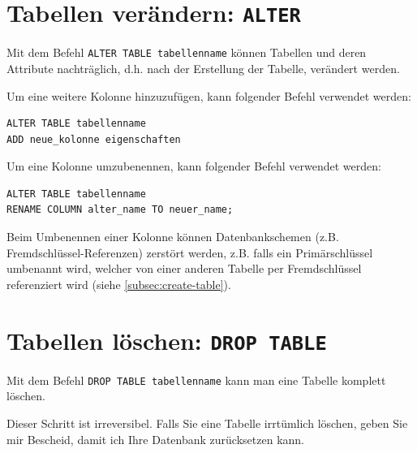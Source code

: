 \section{Tabellen verändern: \texorpdfstring{\lstinline|ALTER|}{ALTER}}
Mit dem Befehl \lstinline|ALTER TABLE tabellenname| können Tabellen und deren Attribute nachträglich, d.h. nach der Erstellung der Tabelle, verändert werden.

\begin{myexample}
Um eine weitere Kolonne hinzuzufügen, kann folgender Befehl verwendet werden:
\begin{lstlisting}
ALTER TABLE tabellenname
ADD neue_kolonne eigenschaften
\end{lstlisting}
\end{myexample}

\begin{myexample}
Um eine Kolonne umzubenennen, kann folgender Befehl verwendet werden:
\begin{lstlisting}
ALTER TABLE tabellenname
RENAME COLUMN alter_name TO neuer_name;
\end{lstlisting}
\end{myexample}
\begin{mycaution}
Beim Umbenennen einer Kolonne können Datenbankschemen (z.B. Fremdschlüssel-Referenzen) zerstört werden, z.B. falls ein Primärschlüssel umbenannt wird, welcher von einer anderen Tabelle per Fremdschlüssel referenziert wird (siehe \cref{subsec:create-table}).
\end{mycaution}

\section{Tabellen löschen: \texorpdfstring{\lstinline|DROP TABLE|}{DROP TABLE}}
Mit dem Befehl \lstinline|DROP TABLE tabellenname| kann man eine Tabelle komplett löschen.

\begin{mycaution}
  Dieser Schritt ist irreversibel. Falls Sie eine Tabelle irrtümlich löschen, geben Sie mir Bescheid, damit ich Ihre Datenbank zurücksetzen kann.
\end{mycaution}

